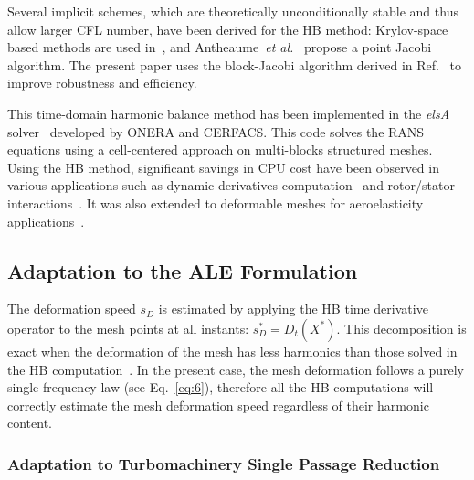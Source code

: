 Several implicit schemes, which are theoretically unconditionally stable and thus allow larger
CFL number, have been derived for the HB method: Krylov-space based
methods are used
in~\cite{FLD:FLD2111,woodgate09:_implic_harmon_balan_solver_for}, and
Antheaume~\emph{et
  al.}~\cite{antheaume11:_implic_time_spect_method_for} propose a
point Jacobi algorithm. The present paper uses the block-Jacobi
algorithm derived in Ref.~\cite{Sicot2008} to improve robustness and
efficiency.

This time-domain harmonic balance method has been implemented in the
\emph{elsA} solver~\cite{cambier2012} developed by ONERA and
CERFACS. This code solves the RANS equations using a cell-centered
approach on multi-blocks structured meshes.  Using the HB method,
significant savings in CPU cost have been observed in various
applications such as dynamic derivatives computation~\cite{Hassan2011}
and rotor/stator interactions~\cite{Sicot2012}. It was also extended
to deformable meshes for aeroelasticity
applications~\cite{Dufour2010}.

\subsection{Adaptation to the ALE Formulation}
\label{sec:adapt-ale-form}

The deformation speed $s_D$ is estimated by applying the HB time
derivative operator to the mesh points at all instants:
$s_D^*=D_t(X^*)$. This decomposition is exact when the
  deformation of the mesh has less harmonics than those solved in the
  HB computation~\cite{Dufour2010}. In the present case, the mesh
  deformation follows a purely single frequency law (see
  Eq.~\eqref{eq:6}), therefore all the HB computations will correctly
  estimate the mesh deformation speed regardless of their harmonic content.


\subsubsection{Adaptation to Turbomachinery Single Passage
    Reduction}
\label{sec:Adptatreduction}

